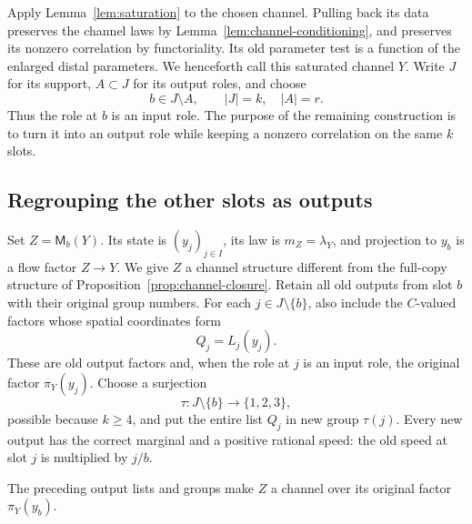 Apply Lemma~\ref{lem:saturation} to the chosen channel. Pulling back
its data preserves the channel laws by
Lemma~\ref{lem:channel-conditioning}, and preserves its nonzero
correlation by functoriality. Its old parameter test is a function of
the enlarged distal parameters. We henceforth call this saturated
channel $Y$. Write $J$ for its support, $A\subset J$ for its output
roles, and choose
\[
  b\in J\setminus A,
  \qquad |J|=k,\quad |A|=r.
\]
Thus the role at $b$ is an input role. The purpose of the remaining
construction is to turn it into an output role while keeping a
nonzero correlation on the same $k$ slots.

\subsection{Regrouping the other slots as outputs}

Set $Z=\mathsf M_b(Y)$. Its state is $(y_j)_{j\in I}$, its law is
$m_Z=\lambda_Y$, and projection to $y_b$ is a flow factor $Z\to Y$.
We give $Z$ a channel structure different from the full-copy structure
of Proposition~\ref{prop:channel-closure}. Retain all old outputs from
slot $b$ with their original group numbers. For each $j\in J\setminus\{b\}$,
also include the $C$-valued factors whose spatial coordinates form
\[
 Q_j=L_j(y_j).
\]
These are old output factors and, when the role at $j$ is an input
role, the original factor $\pi_Y(y_j)$. Choose a surjection
\[
 \tau:J\setminus\{b\}\longrightarrow\{1,2,3\},
\]
possible because $k\geq4$, and put the entire list $Q_j$ in new group
$\tau(j)$. Every new output has the correct marginal and a positive
rational speed: the old speed at slot $j$ is multiplied by $j/b$.

\begin{lemma}
\label{lem:regrouped-channel}
The preceding output lists and groups make $Z$ a channel over its
original factor $\pi_Y(y_b)$.
\end{lemma}

